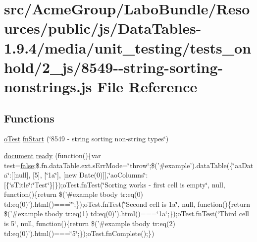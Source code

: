 \hypertarget{8549--string-sorting-nonstrings_8js}{\section{src/\+Acme\+Group/\+Labo\+Bundle/\+Resources/public/js/\+Data\+Tables-\/1.9.4/media/unit\+\_\+testing/tests\+\_\+onhold/2\+\_\+js/8549-\/-\/string-\/sorting-\/nonstrings.js File Reference}
\label{8549--string-sorting-nonstrings_8js}
}
\subsection*{Functions}
\begin{DoxyCompactItemize}
\item 
\hyperlink{unit__test_8js_a3b2d259e2df3b6860d9047a92d09d0d6}{o\+Test} \hyperlink{8549--string-sorting-nonstrings_8js_a3dda4788887f029ff6b2504a4703f648}{fn\+Start} (\char`\"{}8549 -\/ string sorting non-\/string types\char`\"{})
\item 
\hyperlink{outside_events_8js_aa14f8e0338cced6720590fd2ea13bd4b}{document} \hyperlink{8549--string-sorting-nonstrings_8js_ad1ce8bb4e86c14c90e98a467ea0244ad}{ready} (function()\{var test=\hyperlink{validate_8js_a5df37b7f02e5cdc7d9412b7f872b8e01}{false};\$.fn.\+data\+Table.\+ext.\+s\+Err\+Mode=\char`\"{}throw\char`\"{};\$('\#example').data\+Table(\{\char`\"{}aa\+Data\char`\"{}\+:\mbox{[}\mbox{[}null\mbox{]}, \mbox{[}5\mbox{]}, \mbox{[}\char`\"{}1a\char`\"{}\mbox{]}, \mbox{[}new Date(0)\mbox{]}\mbox{]},\char`\"{}ao\+Columns\char`\"{}\+:\mbox{[}\{\char`\"{}s\+Title\char`\"{}\+:\char`\"{}\+Test\char`\"{}\}\mbox{]}\});o\+Test.\+fn\+Test(\char`\"{}\+Sorting works -\/ first cell is empty\char`\"{}, null, function()\{return \$('\#example tbody tr\+:eq(0) td\+:eq(0)').\+html()===\char`\"{}\char`\"{};\});o\+Test.\+fn\+Test(\char`\"{}\+Second cell is 1a\char`\"{}, null, function()\{return \$('\#example tbody tr\+:eq(1) td\+:eq(0)').\+html()===\char`\"{}1a\char`\"{};\});o\+Test.\+fn\+Test(\char`\"{}\+Third cell is 5\char`\"{}, null, function()\{return \$('\#example tbody tr\+:eq(2) td\+:eq(0)').\+html()===\char`\"{}5\char`\"{};\});o\+Test.\+fn\+Complete();\})
\end{DoxyCompactItemize}


